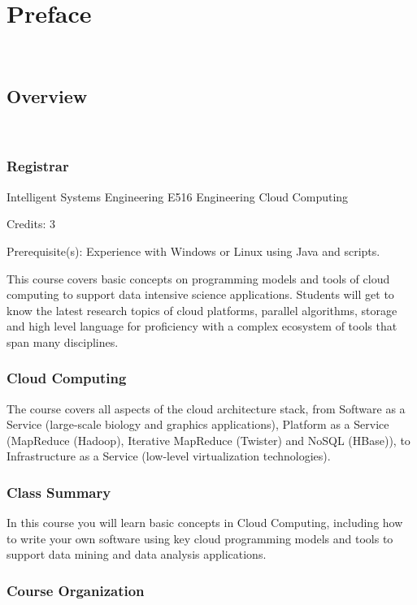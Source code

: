 \part{Preface}

\FILENAME\

\chapter{Overview}

\FILENAME\

\section{Registrar}

Intelligent Systems Engineering
E516 Engineering Cloud Computing

Credits: 3

Prerequisite(s): Experience with Windows or Linux using Java and scripts.

This course covers basic concepts on programming models and tools of
cloud computing to support data intensive science
applications. Students will get to know the latest research topics of
cloud platforms, parallel algorithms, storage and high level language
for proficiency with a complex ecosystem of tools that span many
disciplines.  


\section{Cloud Computing}

The course covers all aspects of the cloud architecture stack, from
Software as a Service (large-scale biology and graphics applications),
Platform as a Service (MapReduce (Hadoop), Iterative MapReduce
(Twister) and NoSQL (HBase)), to Infrastructure as a Service
(low-level virtualization technologies).



\section{Class Summary}

In this course you will learn basic concepts in Cloud Computing,
including how to write your own software using key cloud programming
models and tools to support data mining and data analysis
applications.

\section{Course Organization}

